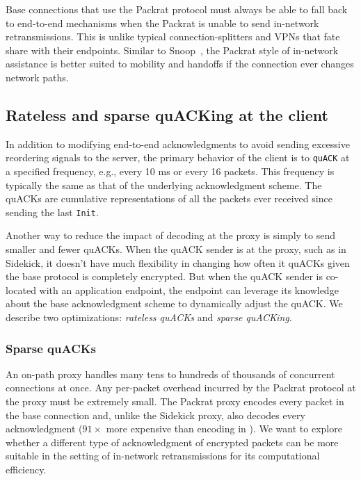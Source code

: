 Base connections that use the Packrat protocol must always be able to fall back to
end-to-end mechanisms when the Packrat is unable to send in-network
retransmissions. This is unlike typical connection-splitters and VPNs that fate
share with their endpoints. Similar to Snoop~\cite{balakrishnan1995snoop},
the Packrat style of in-network
assistance is better suited to mobility and handoffs if the connection ever
changes network paths.

\subsection{Rateless and sparse quACKing at the client}
\label{sec:packrat:design:client}

In addition to modifying end-to-end acknowledgments to avoid sending excessive
reordering signals to the server, the primary behavior of the client is
to \texttt{quACK} at a specified frequency, e.g., every 10 ms or every 16
packets. This frequency is typically the same as that of the underlying
acknowledgment scheme. The quACKs are cumulative representations of all the
packets ever received since sending the last \texttt{Init}.

Another way to reduce the impact of decoding at the proxy is simply to send smaller
and fewer quACKs. When the quACK sender is at the proxy, such as in Sidekick,
it doesn't have much flexibility in changing how often it quACKs given
the base protocol is completely encrypted. But when the quACK sender is co-located
with an application endpoint, the endpoint can leverage its knowledge about the
base acknowledgment scheme to dynamically adjust the quACK.
We describe two optimizations: \textit{rateless quACKs} and \textit{sparse quACKing}.

\subsubsection{Sparse quACKs}
\label{sec:packrat:receiver:sparse}

An on-path proxy handles many tens to hundreds of thousands of concurrent
connections at once. Any per-packet overhead incurred by the Packrat protocol
at the proxy must be extremely small. The Packrat proxy encodes every packet in
the base connection and, unlike the Sidekick proxy, also decodes every
acknowledgment ($91\!\times$ more expensive than encoding in \cite
{yuan2024sidekick}). We want to explore whether a different type of
acknowledgment of encrypted packets can be more suitable in the setting of
in-network retransmissions for its computational efficiency.

